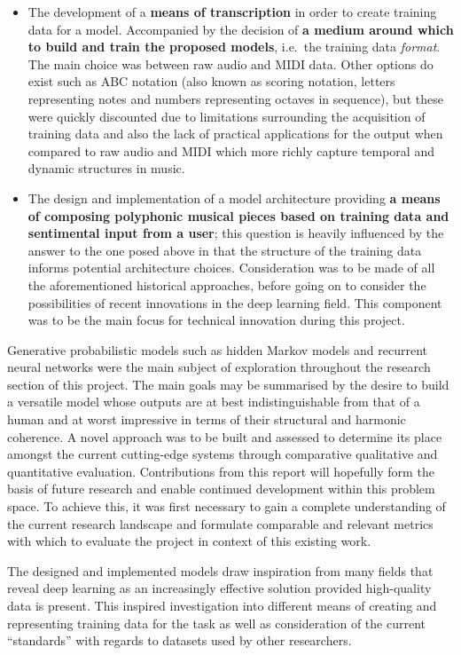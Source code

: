 \documentclass[12pt,]{article}
\providecommand{\tightlist}{%
  \setlength{\itemsep}{0pt}\setlength{\parskip}{0pt}}
\begin{document}
\begin{itemize}
\tightlist
\item
  The development of a \textbf{means of transcription} in order to
  create training data for a model. Accompanied by the decision of
  \textbf{a medium around which to build and train the proposed models},
  i.e.~the training data \emph{format}. The main choice was between raw
  audio and MIDI data. Other options do exist such as ABC notation (also
  known as scoring notation, letters representing notes and numbers
  representing octaves in sequence), but these were quickly discounted
  due to limitations surrounding the acquisition of training data and
  also the lack of practical applications for the output when compared
  to raw audio and MIDI which more richly capture temporal and dynamic
  structures in music.
\item
  The design and implementation of a model architecture providing
  \textbf{a means of composing polyphonic musical pieces based on
  training data and sentimental input from a user}; this question is
  heavily influenced by the answer to the one posed above in that the
  structure of the training data informs potential architecture choices.
  Consideration was to be made of all the aforementioned historical
  approaches, before going on to consider the possibilities of recent
  innovations in the deep learning field. This component was to be the
  main focus for technical innovation during this project.
\end{itemize}

Generative probabilistic models such as hidden Markov models and
recurrent neural networks were the main subject of exploration
throughout the research section of this project. The main goals may be
summarised by the desire to build a versatile model whose outputs are at
best indistinguishable from that of a human and at worst impressive in
terms of their structural and harmonic coherence. A novel approach was
to be built and assessed to determine its place amongst the current
cutting-edge systems through comparative qualitative and quantitative
evaluation. Contributions from this report will hopefully form the basis
of future research and enable continued development within this problem
space. To achieve this, it was first necessary to gain a complete
understanding of the current research landscape and formulate comparable
and relevant metrics with which to evaluate the project in context of
this existing work.

The designed and implemented models draw inspiration from many fields
that reveal deep learning as an increasingly effective solution provided
high-quality data is present. This inspired investigation into different
means of creating and representing training data for the task as well as
consideration of the current ``standards'' with regards to datasets used
by other researchers.
\end{document}
